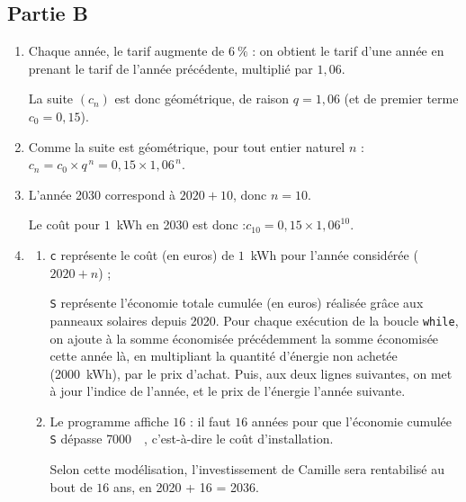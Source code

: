 \documentclass[10pt]{article}
\providecommand{\euro}{\texteuro}
\providecommand{\np}[2][]{{#2~#1}}
\providecommand{\euro}{{\text{€}}}
\renewcommand{\euro}{\ifmmode\text{\texteuro}\else\texteuro\fi}
\begin{document}
	\subsection*{Partie B}

	\begin{enumerate}
		\item Chaque année, le tarif augmente de $6~\%$ : on obtient le tarif d'une année en prenant le tarif de l'année précédente, multiplié par $1,06$.

		La suite $\left(c_{n}\right)$ est donc géométrique, de raison $q=1,06$ (et de premier terme $c_{0}=0,15$).

		\item Comme la suite est géométrique, pour tout entier naturel $n$ : \quad $c_{n}=c_{0}\times q^{\,n}=0,15\times 1,06^{\,n}$.

		\item L'année 2030 correspond à $2020 + 10$, donc $n=10$.

		Le coût pour $1$~kWh en 2030 est donc :\quad $c_{10}=0,15\times 1,06^{10}$.

		\item \begin{enumerate}
			\item \texttt{c} représente le coût (en euros) de $1$~kWh pour l'année considérée ($2020+n$) ;

			\texttt{S} représente l'économie totale cumulée (en euros) réalisée grâce aux panneaux solaires depuis 2020. Pour chaque exécution de la boucle \texttt{while}, on ajoute à la somme économisée précédemment la somme économisée cette année là, en multipliant la quantité d'énergie non achetée (\np[kWh]{2000}), par le prix d'achat. Puis, aux deux lignes suivantes, on met à jour l'indice de l'année, et le prix de l'énergie l'année suivante.

			\item Le programme affiche $16$ : il faut $16$ années pour que l'économie cumulée \texttt{S} dépasse \np{7000}~\euro{}, c'est-à-dire le coût d'installation.

			Selon cette modélisation, l'investissement de Camille sera rentabilisé au bout de $16$ ans, en 2020 + 16 = 2036.
		\end{enumerate}
	\end{enumerate}
\end{document}
